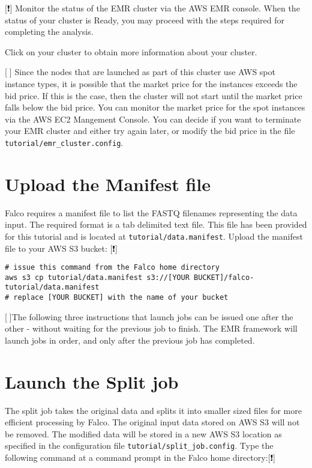 \documentclass[]{book}
\begin{document}
{[}❗️{]} Monitor the status of the EMR cluster via the AWS EMR console. When the status of your cluster is Ready, you may proceed with the steps required for completing the analysis.

Click on your cluster to obtain more information about your cluster.

{[}🔴{]} Since the nodes that are launched as part of this cluster use AWS spot instance types, it is possible that the market price for the instances exceeds the bid price. If this is the case, then the cluster will not start until the market price falls below the bid price. You can monitor the market price for the spot instances via the AWS EC2 Mangement Console. You can decide if you want to terminate your EMR cluster and either try again later, or modify the bid price in the file \texttt{tutorial/emr\_cluster.config}.

\hypertarget{upload-the-manifest-file}{%
\section{Upload the Manifest file}\label{upload-the-manifest-file}}

Falco requires a manifest file to list the FASTQ filenames representing the data input. The required format is a tab delimited text file. This file has been provided for this tutorial and is located at \texttt{tutorial/data.manifest}. Upload the manifest file to your AWS S3 bucket: {[}❗️{]}

\begin{verbatim}
# issue this command from the Falco home directory
aws s3 cp tutorial/data.manifest s3://[YOUR BUCKET]/falco-tutorial/data.manifest
# replace [YOUR BUCKET] with the name of your bucket
\end{verbatim}

{[}🔴{]}The following three instructions that launch jobs can be issued one after the other - without waiting for the previous job to finish. The EMR framework will launch jobs in order, and only after the previous job has completed.

\hypertarget{launch-the-split-job}{%
\section{Launch the Split job}\label{launch-the-split-job}}

The split job takes the original data and splits it into smaller sized files for more efficient processing by Falco. The original input data stored on AWS S3 will not be removed. The modified data will be stored in a new AWS S3 location as specified in the configuration file \texttt{tutorial/split\_job.config}. Type the following command at a command prompt in the Falco home directory:{[}❗️{]}
\end{document}
